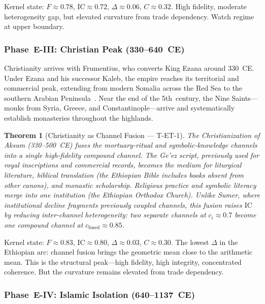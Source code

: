 \documentclass[
  aps,
  prd,
  twocolumn,
  superscriptaddress,
  nofootinbib,
  floatfix
]{revtex4-2}
\newtheorem{theorem}{Theorem}
\newcommand{\IC}{\mathrm{IC}}
\begin{document}
Kernel state: $F \approx 0.78$, $\IC \approx 0.72$,
$\Delta \approx 0.06$, $C \approx 0.32$.  High
fidelity, moderate heterogeneity gap, but elevated
curvature from trade dependency.  Watch regime at
upper boundary.

\subsubsection{Phase~E-III: Christian Peak
(330--640~CE)}\label{sec:christian}

Christianity arrives with Frumentius, who converts
King Ezana around 330~CE.  Under Ezana and his
successor Kaleb, the empire reaches its territorial
and commercial peak, extending from modern Somalia
across the Red Sea to the southern Arabian
Peninsula~\cite{munrohay1991aksum}.  Near the end of
the 5th~century, the Nine Saints---monks from Syria,
Greece, and Constantinople---arrive and
systematically establish monasteries throughout the
highlands.

\begin{theorem}[Christianity as Channel Fusion ---
T-ET-1]\label{thm:fusion}
The Christianization of Aksum (330--500~CE) fuses
the mortuary-ritual and symbolic-knowledge channels
into a single high-fidelity compound channel.  The
Ge'ez script, previously used for royal inscriptions
and commercial records, becomes the medium for
liturgical literature, biblical translation (the
Ethiopian Bible includes books absent from other
canons), and monastic scholarship.  Religious
practice and symbolic literacy merge into one
institution (the Ethiopian Orthodox Church).  Unlike
Sumer, where institutional decline fragments
previously coupled channels, this fusion
\emph{raises} $\IC$ by reducing inter-channel
heterogeneity: two separate channels at $c_i
\approx 0.7$ become one compound channel at
$c_{\mathrm{fused}} \approx 0.85$.
\end{theorem}

Kernel state: $F \approx 0.83$, $\IC \approx 0.80$,
$\Delta \approx 0.03$, $C \approx 0.30$.  The
lowest $\Delta$ in the Ethiopian arc: channel fusion
brings the geometric mean close to the arithmetic
mean.  This is the structural peak---high fidelity,
high integrity, concentrated coherence.  But the
curvature remains elevated from trade dependency.

\subsubsection{Phase~E-IV: Islamic Isolation
(640--1137~CE)}\label{sec:isolation}
\end{document}
